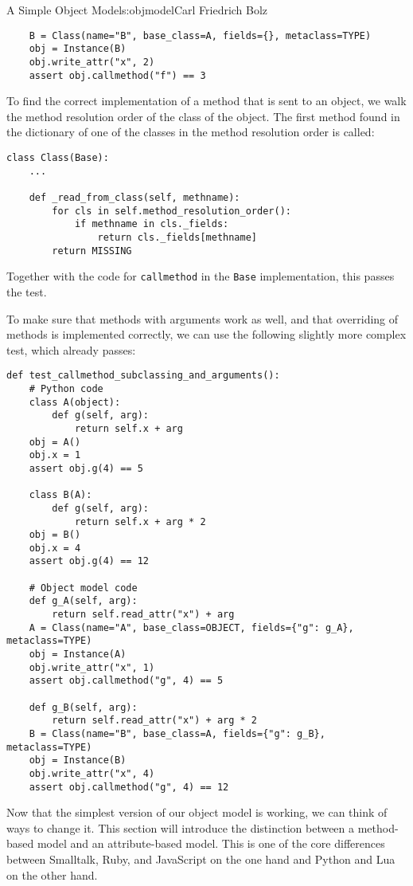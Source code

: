 \begin{aosachapter}{A Simple Object Model}{s:objmodel}{Carl Friedrich Bolz}
\begin{verbatim}
    B = Class(name="B", base_class=A, fields={}, metaclass=TYPE)
    obj = Instance(B)
    obj.write_attr("x", 2)
    assert obj.callmethod("f") == 3
\end{verbatim}

To find the correct implementation of a method that is sent to an
object, we walk the method resolution order of the class of the object.
The first method found in the dictionary of one of the classes in the
method resolution order is called:

\begin{verbatim}
class Class(Base):
    ...

    def _read_from_class(self, methname):
        for cls in self.method_resolution_order():
            if methname in cls._fields:
                return cls._fields[methname]
        return MISSING
\end{verbatim}

Together with the code for \texttt{callmethod} in the \texttt{Base}
implementation, this passes the test.

To make sure that methods with arguments work as well, and that
overriding of methods is implemented correctly, we can use the following
slightly more complex test, which already passes:

\begin{verbatim}
def test_callmethod_subclassing_and_arguments():
    # Python code
    class A(object):
        def g(self, arg):
            return self.x + arg
    obj = A()
    obj.x = 1
    assert obj.g(4) == 5

    class B(A):
        def g(self, arg):
            return self.x + arg * 2
    obj = B()
    obj.x = 4
    assert obj.g(4) == 12

    # Object model code
    def g_A(self, arg):
        return self.read_attr("x") + arg
    A = Class(name="A", base_class=OBJECT, fields={"g": g_A}, metaclass=TYPE)
    obj = Instance(A)
    obj.write_attr("x", 1)
    assert obj.callmethod("g", 4) == 5

    def g_B(self, arg):
        return self.read_attr("x") + arg * 2
    B = Class(name="B", base_class=A, fields={"g": g_B}, metaclass=TYPE)
    obj = Instance(B)
    obj.write_attr("x", 4)
    assert obj.callmethod("g", 4) == 12
\end{verbatim}

\label{attribute-based-model}

Now that the simplest version of our object model is working, we can
think of ways to change it. This section will introduce the distinction
between a method-based model and an attribute-based model. This is one
of the core differences between Smalltalk, Ruby, and JavaScript on the
one hand and Python and Lua on the other hand.


\end{aosachapter}

